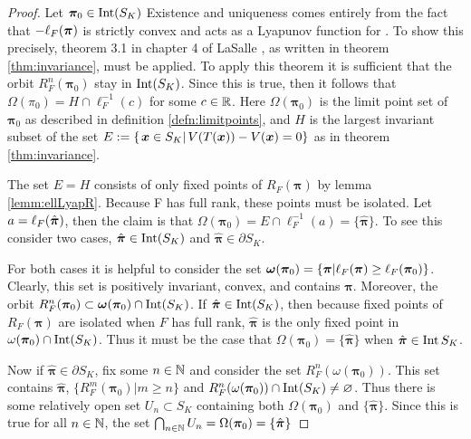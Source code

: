 \begin{proof}
	Let \( \bm\pi_0\in\op{Int}(S_K)  \)
	Existence and uniqueness comes entirely from the fact that \( -\elpi{F} \) is strictly convex and acts as a Lyapunov function for . To show this precisely, theorem 3.1 in chapter 4 of LaSalle \cite{lasalle1976dynsys}, as written in theorem \ref{thm:invariance}, must be applied. To apply this theorem it is sufficient that the orbit \( R_F^n(\bm\pi_0) \) stay in \(\op{Int}(S_K)\). Since this is true, then it follows that \( \Omega(\pi_0) = H\cap \ell_{F}^{-1}(c) \) for some \( c\in \R \).	Here \( \Omega(\bm\pi_0) \) is the limit point set of \( \bm\pi_0 \) as described in definition \ref{defn:limitpoints}, and \( H \) is the largest invariant subset of the set \(E\defined\{\left.\bm x\in S_K\right|V(T(\bm x))-V(\bm x)=0\}\) as in theorem \ref{thm:invariance}. %
	
	The set \( E=H \) consists of only fixed points of \( R_{F}(\bm\pi) \) by lemma \ref{lemm:ellLyapR}. Because F has full rank, these points must be isolated. Let \( a=\elpi[\hat{\bm \pi}]{F} \), then the claim is that \( \Omega(\bm\pi_0) =E\cap\ell_{F}^{-1}(a)= \{\hat{\bm\pi}\}. \) To see this consider two cases, \( \hat{\bm \pi}\in \op{Int}(S_K) \) and \( \hat{\bm \pi}\in \partial S_K \). 
	
    For both cases it is helpful to consider the set \(\bm\omega(\bm\pi_0) = \{\bm\pi|\elpi{F}\geq\ell_{F}(\bm\pi_0)\}\). Clearly, this set is positively invariant, convex, and contains \( \hat{\bm \pi}. \)  Moreover, the orbit \( R_F^n(\bm\pi_0) \subset \bm\omega(\bm\pi_0)\cap \op{Int}(S_K)\). If \( \hat{\bm \pi}\in \op{Int}(S_K) \), then because fixed points of \( R_F(\bm\pi) \) are isolated when \( F \) has full rank, \( \hat{\bm\pi} \)  is the only fixed point in \( \omega(\bm\pi_0)\cap \op{Int}(S_K) \). Thus it must be the case that \( \Omega(\bm\pi_0) = \{\hat{\bm\pi}\} \) when \( \hat{\bm \pi}\in\op{Int}S_K \).
    
    Now if \( \hat{\bm \pi}\in \partial S_K \), fix some \( n\in\N \) and consider the set \( R_F^n(\omega(\bm\pi_0)). \) This set contains \( \hat{\bm \pi} \), \( \{R_F^m(\bm\pi_0)|m\geq n\} \) and \( R_F^n(\omega(\bm\pi_0))\cap\op{Int}(S_K)\neq\varnothing \). Thus there is some relatively open set \( U_n \subset S_K\) containing both \( \Omega(\bm\pi_0) \) and \( \{\hat{\bm\pi}\} \). Since this is true for all \( n\in\N \), the set \( \bigcap_{n\in\N}U_n = \Omega(\bm\pi_0)=\{\hat{\bm\pi}\} \)	
\end{proof}

